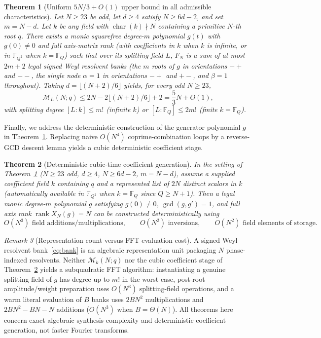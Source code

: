 \documentclass[11pt,reqno]{amsart}
\numberwithin{equation}{section}
\newtheorem{theorem}{Theorem}[section]
\theoremstyle{definition}
\theoremstyle{remark}
\newtheorem{remark}[theorem]{Remark}
\newcommand{\F}{\mathbb{F}}
\newcommand{\rank}{\operatorname{rank}}
\newcommand{\M}{\mathcal{M}}
\begin{document}
\begin{theorem}[Uniform $5N/3 + O(1)$ upper bound in all admissible characteristics]
\label{thm:five-thirds}
Let $N\ge 23$ be odd, let $d\ge 4$ satisfy $N\ge 6d-2$, and set $m=N-d$. Let $k$ be any field with $\operatorname{char}(k)\nmid N$ containing a primitive $N$-th root $q$. There exists a monic squarefree degree-$m$ polynomial $g(t)$ with $g(0)\ne 0$ and full axis-matrix rank (with coefficients in $k$ when $k$ is infinite, or in $\F_{Q^2}$ when $k=\F_Q$) such that over its splitting field $L$, $F_N$ is a sum of at most $2m+2$ legal signed Weyl resolvent banks (the $m$ roots of $g$ in orientations $++$ and $--$, the single node $\alpha=1$ in orientations $-+$ and $+-$, and $\beta=1$ throughout). Taking $d=\lfloor(N+2)/6\rfloor$ yields, for every odd $N\ge 23$,
\begin{equation}
\label{eq:five-thirds}
\M_L(N;q) \le 2N - 2\lfloor(N+2)/6\rfloor + 2 = \frac{5}{3}N + O(1),
\end{equation}
with splitting degree $[L:k]\le m!$ (infinite $k$) or $[L:\F_Q]\le 2m!$ (finite $k=\F_Q$).
\end{theorem}

Finally, we address the deterministic construction of the generator polynomial $g$ in Theorem~\ref{thm:five-thirds}. Replacing naive $O(N^4)$ coprime-combination loops by a reverse-GCD descent lemma yields a cubic deterministic coefficient stage.

\begin{theorem}[Deterministic cubic-time coefficient generation]
\label{thm:cubic}
In the setting of Theorem~\ref{thm:five-thirds} ($N\ge 23$ odd, $d\ge 4$, $N\ge 6d-2$, $m=N-d$), assume a supplied coefficient field $k$ containing $q$ and a represented list of $2N$ distinct scalars in $k$ (automatically available in $\F_{Q^2}$ when $k=\F_Q$ since $Q\ge N+1$). Then a legal monic degree-$m$ polynomial $g$ satisfying $g(0)\ne 0$, $\gcd(g,g')=1$, and full axis rank $\rank X_N(g)=N$ can be constructed deterministically using
\[
O(N^3) \text{ field additions/multiplications},\qquad O(N^2) \text{ inversions},\qquad O(N^2) \text{ field elements of storage}.
\]
\end{theorem}

\begin{remark}[Representation count versus FFT evaluation cost]
\label{rem:cost-boundary}
A signed Weyl resolvent bank~\eqref{eq:bank} is an algebraic representation unit packaging $N$ phase-indexed resolvents. Neither $\M_k(N;q)$ nor the cubic coefficient stage of Theorem~\ref{thm:cubic} yields a subquadratic FFT algorithm: instantiating a genuine splitting field of $g$ has degree up to $m!$ in the worst case, post-root amplitude/weight preparation uses $O(N^3)$ splitting-field operations, and a warm literal evaluation of $B$ banks uses $2BN^2$ multiplications and $2BN^2-BN-N$ additions ($O(N^3)$ when $B=\Theta(N)$). All theorems here concern exact algebraic synthesis complexity and deterministic coefficient generation, not faster Fourier transforms.
\end{remark}
\end{document}
